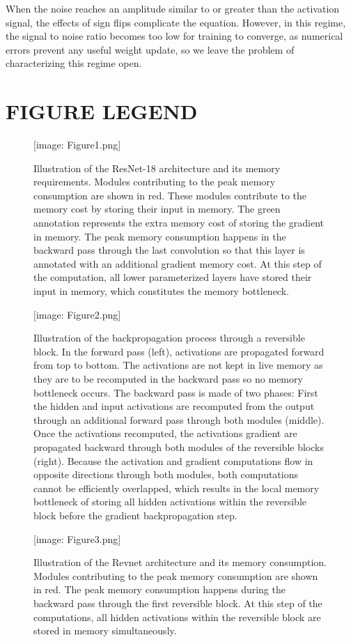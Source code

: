 \documentclass[twocolumn]{bmcart}
\def\texttt{[image: ]}
\begin{document}
\begin{backmatter}
When the noise reaches an amplitude similar to or greater than the activation signal,
the effects of sign flips complicate the equation.
However, in this regime, the signal to noise ratio becomes too low for training to converge,
as numerical errors prevent any useful weight update, so we leave the problem of characterizing this regime open.

\section*{FIGURE LEGEND}

\begin{figure}[t]
\texttt{[image: Figure1.png]}
\caption{
Illustration of the ResNet-18 architecture and its memory requirements.
Modules contributing to the peak memory consumption are shown in red.
These modules contribute to the memory cost by storing their input in memory.
The green annotation represents the extra memory cost of storing the gradient in memory.
The peak memory consumption happens in the backward pass through the last convolution so that this layer is annotated with an additional gradient memory cost.
At this step of the computation, all lower parameterized layers have stored their input in memory, which constitutes the memory bottleneck.
}
\end{figure}

\begin{figure}[t]
\texttt{[image: Figure2.png]}
\caption{
Illustration of the backpropagation process through a reversible block.
In the forward pass (left), activations are propagated forward from top to bottom.
The activations are not kept in live memory as they are to be recomputed in the backward pass so no memory bottleneck occurs.
The backward pass is made of two phases:
First the hidden and input activations are recomputed from the output through an additional forward pass through both modules (middle).
Once the activations recomputed, the activations gradient are propagated backward through both modules of the reversible blocks (right).
Because the activation and gradient computations flow in opposite directions through both modules,
both computations cannot be efficiently overlapped, which results in the local memory bottleneck of
storing all hidden activations within the reversible block before the gradient backpropagation step.
}
\end{figure}

\begin{figure}[t]
\texttt{[image: Figure3.png]}
\caption{
Illustration of the Revnet architecture and its memory consumption.
Modules contributing to the peak memory consumption are shown in red.
The peak memory consumption happens during the backward pass through the first reversible block.
At this step of the computations, all hidden activations within the reversible block are stored in memory simultaneously.
}
\end{figure}


\end{backmatter}
\end{document}
